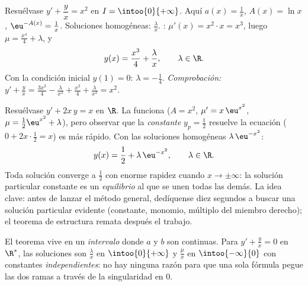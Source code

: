 \begin{example}\label{ex:b1:diffeq:order1}
Resuélvase $y' + \dfrac{y}{x} = x^2$ en $I = \intoo{0}{+\infty}$. Aquí
$a(x) = \frac 1x$, $A(x) = \ln x$, $\eu^{-A(x)} = \frac 1x$. Soluciones
homogéneas: $\frac{\lambda}{x}$. :
$\mu'(x) = x^2 \cdot x = x^3$, luego $\mu = \frac{x^4}{4} + \lambda$, y
\[
y(x) = \frac{x^3}{4} + \frac{\lambda}{x}, \qquad \lambda \in \R .
\]
Con la condición inicial $y(1) = 0$: $\lambda = -\frac14$.
\emph{Comprobación:} $y' + \frac yx = \frac{3x^2}{4} -
\frac{\lambda}{x^2} + \frac{x^2}{4} + \frac{\lambda}{x^2} = x^2$.
\end{example}

\begin{example}\label{ex:b1:diffeq:guess}
Resuélvase $y' + 2x\,y = x$ en $\R$. La 
funciona ($A = x^2$, $\mu' = x\,\eu^{x^2}$,
$\mu = \frac12\eu^{x^2} + \lambda$), pero observar que la
\emph{constante} $y_p = \frac12$ resuelve la ecuación
($0 + 2x\cdot\frac12 = x$) es más rápido. Con las soluciones
homogéneas $\lambda\,\eu^{-x^2}$:
\[
y(x) = \frac12 + \lambda\,\eu^{-x^2}, \qquad \lambda \in \R .
\]
Toda solución converge a $\frac12$ con enorme rapidez cuando
$x \to \pm\infty$: la solución particular constante es un
\emph{equilibrio} al que se unen todas las demás. La idea clave: antes
de lanzar el método general, dedíquense diez segundos a buscar una
solución particular evidente (constante, monomio, múltiplo del miembro
derecho); el teorema de estructura remata después el trabajo.
\end{example}

\begin{remark}
El teorema vive en un \emph{intervalo} donde $a$ y $b$ son continuas.
Para $y' + \frac yx = 0$ en $\R^*$, las soluciones son
$\frac{\lambda}{x}$ en $\intoo{0}{+\infty}$ y $\frac{\mu}{x}$ en
$\intoo{-\infty}{0}$ con constantes \emph{independientes}: no hay
ninguna razón para que una sola fórmula pegue las dos ramas a través de
la singularidad en $0$.
\end{remark}

